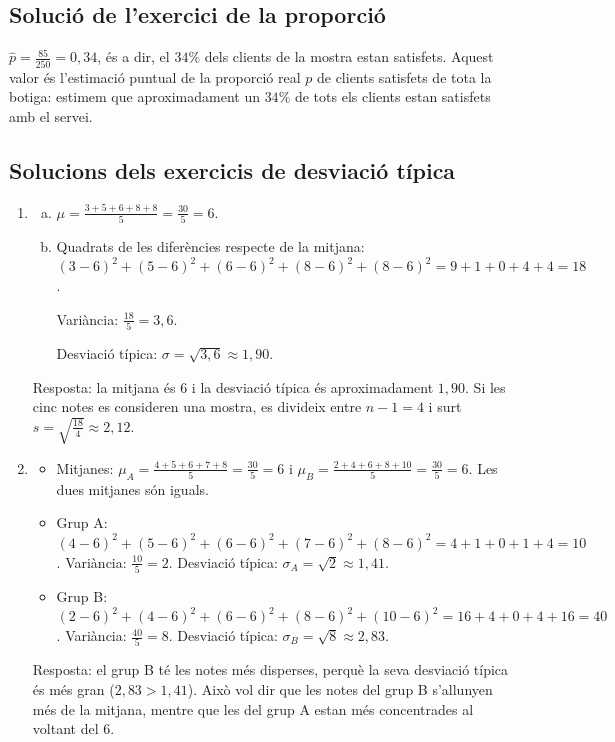\subsection{Solució de l'exercici de la proporció}
$\hat{p}=\frac{85}{250}=0{,}34$, és a dir, el $34\%$ dels clients de la mostra estan satisfets. Aquest valor és l'estimació puntual de la proporció real $p$ de clients satisfets de tota la botiga: estimem que aproximadament un $34\%$ de tots els clients estan satisfets amb el servei.


\subsection{Solucions dels exercicis de desviació típica}
\begin{enumerate}
 \item
 \begin{enumerate}[a)]
  \item $\mu=\frac{3+5+6+8+8}{5}=\frac{30}{5}=6$.
  \item Quadrats de les diferències respecte de la mitjana: $(3-6)^2+(5-6)^2+(6-6)^2+(8-6)^2+(8-6)^2=9+1+0+4+4=18$.

  Variància: $\frac{18}{5}=3{,}6$.

  Desviació típica: $\sigma=\sqrt{3{,}6}\approx1{,}90$.
 \end{enumerate}
 Resposta: la mitjana és $6$ i la desviació típica és aproximadament $1{,}90$. Si les cinc notes es consideren una mostra, es divideix entre $n-1=4$ i surt $s=\sqrt{\frac{18}{4}}\approx2{,}12$.

 \item
 \begin{itemize}
  \item Mitjanes: $\mu_A=\frac{4+5+6+7+8}{5}=\frac{30}{5}=6$ i $\mu_B=\frac{2+4+6+8+10}{5}=\frac{30}{5}=6$. Les dues mitjanes són iguals.
  \item Grup A: $(4-6)^2+(5-6)^2+(6-6)^2+(7-6)^2+(8-6)^2=4+1+0+1+4=10$. Variància: $\frac{10}{5}=2$. Desviació típica: $\sigma_A=\sqrt{2}\approx1{,}41$.
  \item Grup B: $(2-6)^2+(4-6)^2+(6-6)^2+(8-6)^2+(10-6)^2=16+4+0+4+16=40$. Variància: $\frac{40}{5}=8$. Desviació típica: $\sigma_B=\sqrt{8}\approx2{,}83$.
 \end{itemize}
 Resposta: el grup B té les notes més disperses, perquè la seva desviació típica és més gran ($2{,}83>1{,}41$). Això vol dir que les notes del grup B s'allunyen més de la mitjana, mentre que les del grup A estan més concentrades al voltant del $6$.
\end{enumerate}


